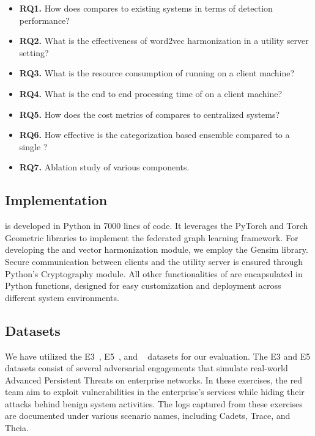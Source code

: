 \begin{itemize}[leftmargin=*]
\item \textbf{RQ1.} How does \Sys compares to existing systems in terms of detection performance?
\item \textbf{RQ2.} What is the effectiveness of word2vec harmonization in a utility server setting?
\item \textbf{RQ3.} What is the resource consumption of \Sys running on a client machine?
\item \textbf{RQ4.} What is the end to end processing time of \Sys on a client machine?
\item \textbf{RQ5.} How does the cost metrics of \Sys compares to centralized systems?
\item \textbf{RQ6.} How effective is the categorization based \gnnshort ensemble compared to a single \gnnshort?
\item \textbf{RQ7.} Ablation study of various \Sys components.
\end{itemize}

\subsection{Implementation}

\Sys is developed in Python in 7000 lines of code. It leverages the PyTorch and Torch Geometric libraries to implement the federated graph learning framework. For developing the \wordvec and vector harmonization module, we employ the Gensim library. Secure communication between clients and the utility server is ensured through Python's Cryptography module. All other functionalities of \Sys are encapsulated in Python functions, designed for easy customization and deployment across different system environments.


\subsection{Datasets}
We have utilized the \darpa E3~\cite{darpae3}, E5~\cite{darpae5}, and \optc~\cite{darpaoptc} datasets for our evaluation. The E3 and E5 datasets consist of several adversarial engagements that simulate real-world Advanced Persistent Threats on enterprise networks. In these exercises, the red team aim to exploit vulnerabilities in the enterprise's services while hiding their attacks behind benign system activities. The logs captured from these exercises are documented under various scenario names, including Cadets, Trace, and Theia.

